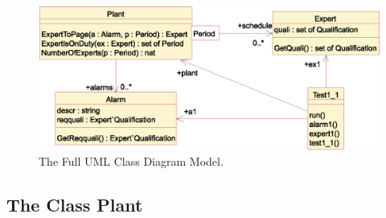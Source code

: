\documentclass[\pformat,12pt,twoside]{article}
\begin{document}
\begin{figure}[htbp]
\begin{center}
\includegraphics[width=5.967in]{fulldiagram}
\caption{The Full UML Class Diagram Model. \label{fig:fulldiagram}}
\end{center}
\end{figure}

\subsection{The Class Plant}
\end{document}
